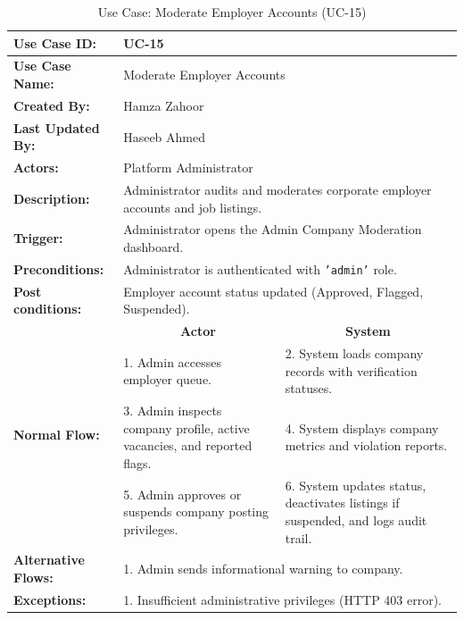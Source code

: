 \begin{table}[H]
\centering
\small
\caption{Use Case: Moderate Employer Accounts (UC-15)}
\label{tab:uc15_spec}
\begin{tabular}{|p{3.2cm}|p{5.5cm}|p{5.5cm}|}
\hline
\textbf{Use Case ID:} & \multicolumn{2}{p{11.4cm}|}{UC-15} \\ \hline
\textbf{Use Case Name:} & \multicolumn{2}{p{11.4cm}|}{Moderate Employer Accounts} \\ \hline
\textbf{Created By:} & \multicolumn{2}{p{11.4cm}|}{Hamza Zahoor} \\ \hline
\textbf{Last Updated By:} & \multicolumn{2}{p{11.4cm}|}{Haseeb Ahmed} \\ \hline
\textbf{Actors:} & \multicolumn{2}{p{11.4cm}|}{Platform Administrator} \\ \hline
\textbf{Description:} & \multicolumn{2}{p{11.4cm}|}{Administrator audits and moderates corporate employer accounts and job listings.} \\ \hline
\textbf{Trigger:} & \multicolumn{2}{p{11.4cm}|}{Administrator opens the Admin Company Moderation dashboard.} \\ \hline
\textbf{Preconditions:} & \multicolumn{2}{p{11.4cm}|}{Administrator is authenticated with \texttt{'admin'} role.} \\ \hline
\textbf{Post conditions:} & \multicolumn{2}{p{11.4cm}|}{Employer account status updated (Approved, Flagged, Suspended).} \\ \hline
\multirow{4}{*}{\textbf{Normal Flow:}} & \multicolumn{1}{c|}{\textbf{Actor}} & \multicolumn{1}{c|}{\textbf{System}} \\ \cline{2-3}
& 1. Admin accesses employer queue. & 2. System loads company records with verification statuses. \vspace{2pt} \\
& 3. Admin inspects company profile, active vacancies, and reported flags. & 4. System displays company metrics and violation reports. \vspace{2pt} \\
& 5. Admin approves or suspends company posting privileges. & 6. System updates status, deactivates listings if suspended, and logs audit trail. \\ \hline
\textbf{Alternative Flows:} & \multicolumn{2}{p{11.4cm}|}{1. Admin sends informational warning to company.} \\ \hline
\textbf{Exceptions:} & \multicolumn{2}{p{11.4cm}|}{1. Insufficient administrative privileges (HTTP 403 error).} \\ \hline
\end{tabular}
\end{table}

